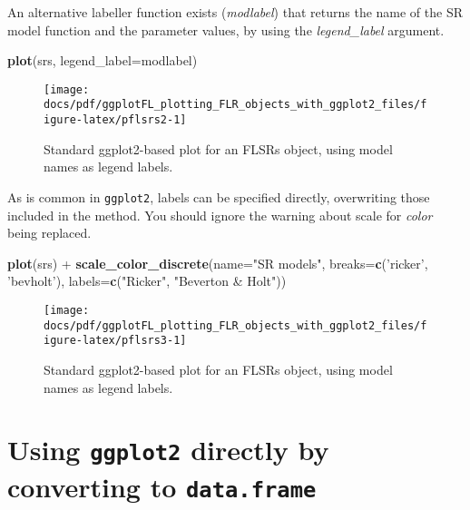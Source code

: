 \documentclass[]{article}
\newenvironment{Shaded}{\begin{snugshade}}{\end{snugshade}}
\newcommand{\KeywordTok}[1]{\textcolor[rgb]{0.13,0.29,0.53}{\textbf{{#1}}}}
\newcommand{\DataTypeTok}[1]{\textcolor[rgb]{0.13,0.29,0.53}{{#1}}}
\newcommand{\StringTok}[1]{\textcolor[rgb]{0.31,0.60,0.02}{{#1}}}
\newcommand{\NormalTok}[1]{{#1}}
\begin{document}
An alternative labeller function exists (\emph{modlabel}) that returns
the name of the SR model function and the parameter values, by using the
\emph{legend\_label} argument.

\begin{Shaded}
\begin{Highlighting}[]
\KeywordTok{plot}\NormalTok{(srs, }\DataTypeTok{legend_label=}\NormalTok{modlabel) }
\end{Highlighting}
\end{Shaded}

\begin{figure}

{\centering \texttt{[image: docs/pdf/ggplotFL\_plotting\_FLR\_objects\_with\_ggplot2\_files/figure-latex/pflsrs2-1]} 

}

\caption{Standard ggplot2-based plot for an FLSRs object, using model names as legend labels.}\label{fig:pflsrs2}
\end{figure}

As is common in \texttt{ggplot2}, labels can be specified directly,
overwriting those included in the method. You should ignore the warning
about scale for \emph{color} being replaced.

\begin{Shaded}
\begin{Highlighting}[]
\KeywordTok{plot}\NormalTok{(srs) +}\StringTok{ }\KeywordTok{scale_color_discrete}\NormalTok{(}\DataTypeTok{name=}\StringTok{"SR models"}\NormalTok{, }\DataTypeTok{breaks=}\KeywordTok{c}\NormalTok{(}\StringTok{'ricker'}\NormalTok{, }\StringTok{'bevholt'}\NormalTok{),}
\DataTypeTok{labels=}\KeywordTok{c}\NormalTok{(}\StringTok{"Ricker"}\NormalTok{, }\StringTok{"Beverton & Holt"}\NormalTok{))}
\end{Highlighting}
\end{Shaded}

\begin{figure}

{\centering \texttt{[image: docs/pdf/ggplotFL\_plotting\_FLR\_objects\_with\_ggplot2\_files/figure-latex/pflsrs3-1]} 

}

\caption{Standard ggplot2-based plot for an FLSRs object, using model names as legend labels.}\label{fig:pflsrs3}
\end{figure}

\section{\texorpdfstring{Using \texttt{ggplot2} directly by converting
to
\texttt{data.frame}}{Using ggplot2 directly by converting to data.frame}}\label{using-ggplot2-directly-by-converting-to-data.frame}
\end{document}
